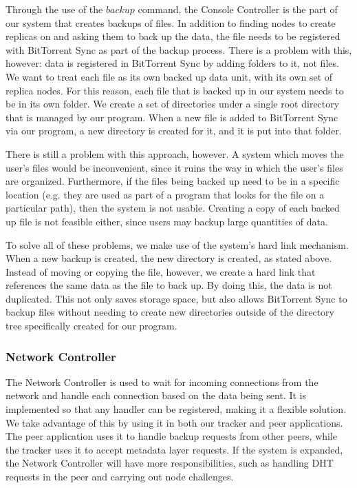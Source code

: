 \documentclass[12pt]{report}
\begin{document}
Through the use of the $backup$ command, the Console Controller is the part of our system that creates backups of files. In addition to finding nodes to create replicas on and asking them to back up the data, the file needs to be registered with BitTorrent Sync as part of the backup process. There is a problem with this, however: data is registered in BitTorrent Sync by adding folders to it, not files. We want to treat each file as its own backed up data unit, with its own set of replica nodes. For this reason, each file that is backed up in our system needs to be in its own folder. We create a set of directories under a single root directory that is managed by our program. When a new file is added to BitTorrent Sync via our program, a new directory is created for it, and it is put into that folder.

There is still a problem with this approach, however. A system which moves the user's files would be inconvenient, since it ruins the way in which the user's files are organized. Furthermore, if the files being backed up need to be in a specific location (e.g. they are used as part of a program that looks for the file on a particular path), then the system is not usable. Creating a copy of each backed up file is not feasible either, since users may backup large quantities of data.

To solve all of these problems, we make use of the system's hard link mechanism. When a new backup is created, the new directory is created, as stated above. Instead of moving or copying the file, however, we create a hard link that references the same data as the file to back up. By doing this, the data is not duplicated. This not only saves storage space, but also allows BitTorrent Sync to backup files without needing to create new directories outside of the directory tree specifically created for our program. 


\subsubsection{Network Controller} \label{subsubsec:NetworkController_subsec:SystemCore_sec:SystemDesign_chap:Implementation}
The Network Controller is used to wait for incoming connections from the network and handle each connection based on the data being sent. It is implemented so that any handler can be registered, making it a flexible solution. We take advantage of this by using it in both our tracker and peer applications. The peer application uses it to handle backup requests from other peers, while the tracker uses it to accept metadata layer requests. If the system is expanded, the Network Controller will have more responsibilities, such as handling DHT requests in the peer and carrying out node challenges.
\end{document}
